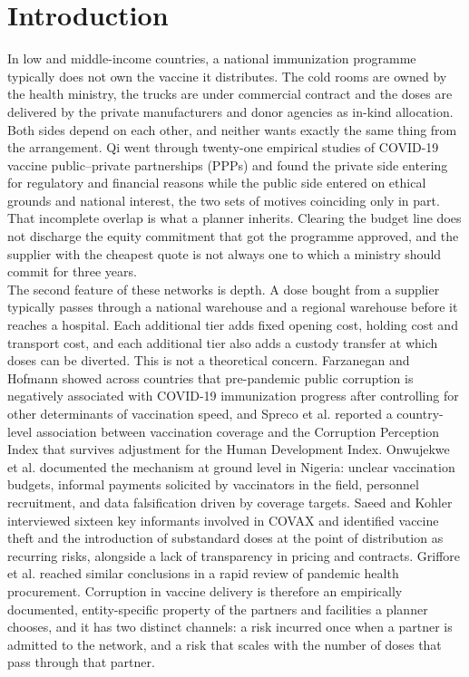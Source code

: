 \documentclass[a4paper]{elsarticle}
\begin{document}
{
\section{Introduction}\label{s1}
\noindent
In low and middle-income countries, a national immunization programme typically does not own the vaccine it distributes. The cold rooms are owned by the health ministry, the trucks are under commercial contract and the doses are delivered by the private manufacturers and donor agencies as in-kind allocation. Both sides depend on each other, and neither wants exactly the same thing from the arrangement. Qi \cite{Qi:2025} went through twenty-one empirical studies of COVID-19 vaccine public--private partnerships (PPPs) and found the private side entering for regulatory and financial reasons while the public side entered on ethical grounds and national interest, the two sets of motives coinciding only in part. That incomplete overlap is what a planner inherits. Clearing the budget line does not discharge the equity commitment that got the programme approved, and the supplier with the cheapest quote is not always one to which a ministry should commit for three years.\\
The second feature of these networks is depth. A dose bought from a supplier typically passes through a national warehouse and a regional warehouse before it reaches a hospital. Each additional tier adds fixed opening cost, holding cost and transport cost, and each additional tier also adds a custody transfer at which doses can be diverted. This is not a theoretical concern. Farzanegan and Hofmann \cite{Farzanegan:2021} showed across countries that pre-pandemic public corruption is negatively associated with COVID-19 immunization progress after controlling for other determinants of vaccination speed, and Spreco et al. \cite{Spreco:2022} reported a country-level association between vaccination coverage and the Corruption Perception Index that survives adjustment for the Human Development Index. Onwujekwe et al. \cite{Onwujekwe:2023} documented the mechanism at ground level in Nigeria: unclear vaccination budgets, informal payments solicited by vaccinators in the field, personnel recruitment, and data falsification driven by coverage targets. Saeed and Kohler \cite{Saeed:2025} interviewed sixteen key informants involved in COVAX and identified vaccine theft and the introduction of substandard doses at the point of distribution as recurring risks, alongside a lack of transparency in pricing and contracts. Griffore et al. \cite{Griffore:2023} reached similar conclusions in a rapid review of pandemic health procurement. Corruption in vaccine delivery is therefore an empirically documented, entity-specific property of the partners and facilities a planner chooses, and it has two distinct channels: a risk incurred once when a partner is admitted to the network, and a risk that scales with the number of doses that pass through that partner.\\
}
\end{document}
